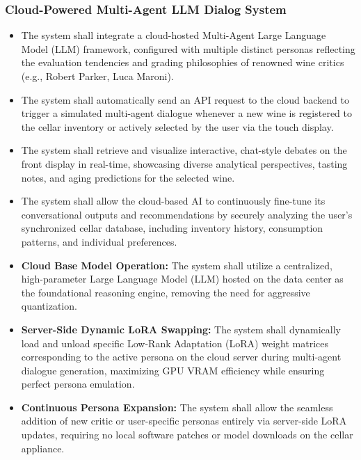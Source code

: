 \documentclass[conference]{IEEEtran}
\begin{document}
\subsubsection{Cloud-Powered Multi-Agent LLM Dialog System}
\begin{itemize}
    \item The system shall integrate a cloud-hosted Multi-Agent Large Language Model (LLM) framework, configured with multiple distinct personas reflecting the evaluation tendencies and grading philosophies of renowned wine critics (e.g., Robert Parker, Luca Maroni).
    \item The system shall automatically send an API request to the cloud backend to trigger a simulated multi-agent dialogue whenever a new wine is registered to the cellar inventory or actively selected by the user via the touch display.
    \item The system shall retrieve and visualize interactive, chat-style debates on the front display in real-time, showcasing diverse analytical perspectives, tasting notes, and aging predictions for the selected wine.
    \item The system shall allow the cloud-based AI to continuously fine-tune its conversational outputs and recommendations by securely analyzing the user's synchronized cellar database, including inventory history, consumption patterns, and individual preferences.
    \item \textbf{Cloud Base Model Operation:} The system shall utilize a centralized, high-parameter Large Language Model (LLM) hosted on the data center as the foundational reasoning engine, removing the need for aggressive quantization.
    \item \textbf{Server-Side Dynamic LoRA Swapping:} The system shall dynamically load and unload specific Low-Rank Adaptation (LoRA) weight matrices corresponding to the active persona on the cloud server during multi-agent dialogue generation, maximizing GPU VRAM efficiency while ensuring perfect persona emulation.
    \item \textbf{Continuous Persona Expansion:} The system shall allow the seamless addition of new critic or user-specific personas entirely via server-side LoRA updates, requiring no local software patches or model downloads on the cellar appliance.
\end{itemize}
\end{document}
